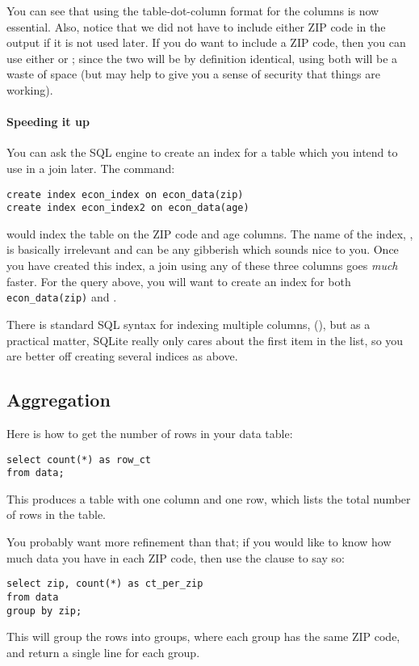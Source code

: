 You can see that using the table-dot-column format for the columns is now
essential. Also, notice that we did not have to include either ZIP code
in the output if it is not used later. If you do want to include a ZIP
code, then you can use either  or ; since
the two will be by definition identical, using both will be a waste of
space (but may help to give you a sense of security that things are working).

\paragraph{Speeding it up}
You can ask the SQL engine to create an index for a table which you
intend to use in a join later. The command:
\begin{lstlisting}
create index econ_index on econ_data(zip)
create index econ_index2 on econ_data(age)
\end{lstlisting}
would index the table  on the ZIP code and age columns.
The name of the index, , is basically irrelevant and can
be any gibberish which sounds nice to you. Once you have created this
index, a join using any of these three columns goes {\sl much} faster.
For the query above, you will want to create an index for both {\tt
econ\_data(zip)} and .

There is standard SQL syntax for indexing multiple columns, 
(), but as a
practical matter, SQLite really only cares about the first item in the
list, so you are better off creating several indices as above.

\subsection{Aggregation}
Here is how to get the number of rows in your data table:
\begin{lstlisting}
select count(*) as row_ct 
from data;
\end{lstlisting}
This produces a table with one column and one row, which lists the total number of rows in the  table.

You probably want more refinement than that; if you would like to
know how much data you have in each ZIP code, then use the  clause to say so:
\begin{lstlisting}
select zip, count(*) as ct_per_zip
from data
group by zip;
\end{lstlisting}
This will group the rows into groups, where each group has the same ZIP
code, and return a single line for each group.


